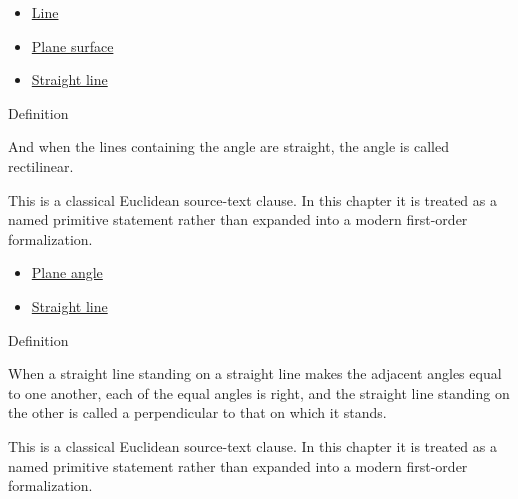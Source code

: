 \begin{lra-not-visible}
\begin{dependencies}
\begin{itemize}
  \item \hyperref[def:euclid-line]{Line}
  \item \hyperref[def:euclid-plane-surface]{Plane surface}
  \item \hyperref[def:euclid-straight-line]{Straight line}
\end{itemize}
\end{dependencies}
\end{lra-not-visible}

\begin{definitionbox}{Definition}
\begin{definition}
\label{def:euclid-rectilinear-angle}
And when the lines containing the angle are straight, the angle is called
rectilinear.
\end{definition}
\end{definitionbox}
\begin{remark*}
This is a classical Euclidean source-text clause. In this chapter it is treated
as a named primitive statement rather than expanded into a modern first-order
formalization.
\end{remark*}

\begin{lra-not-visible}
\begin{dependencies}
\begin{itemize}
  \item \hyperref[def:euclid-plane-angle]{Plane angle}
  \item \hyperref[def:euclid-straight-line]{Straight line}
\end{itemize}
\end{dependencies}
\end{lra-not-visible}

\begin{definitionbox}{Definition}
\begin{definition}
\label{def:euclid-right-angle-and-perpendicular}
When a straight line standing on a straight line makes the adjacent angles equal
to one another, each of the equal angles is right, and the straight line
standing on the other is called a perpendicular to that on which it stands.
\end{definition}
\end{definitionbox}
\begin{remark*}
This is a classical Euclidean source-text clause. In this chapter it is treated
as a named primitive statement rather than expanded into a modern first-order
formalization.
\end{remark*}

